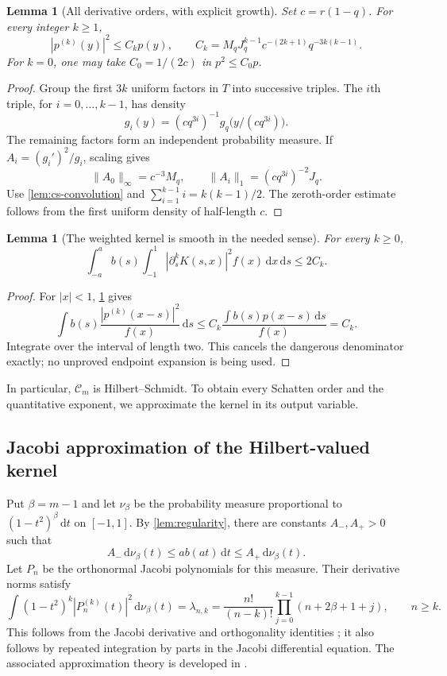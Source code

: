 \documentclass[11pt,a4paper]{article}
\numberwithin{equation}{section}
\newtheorem{lemma}[theorem]{Lemma}
\theoremstyle{definition}\newtheorem{definition}[theorem]{Definition}
\theoremstyle{remark}\newtheorem{remark}[theorem]{Remark}
\newcommand{\dd}{\,\mathrm d}\newcommand{\ii}{\mathrm i}
\newcommand{\calC}{\mathcal C_m}\newcommand{\calP}{\mathcal P}
\newcommand{\norm}[1]{\lVert #1\rVert}
\begin{document}
\begin{lemma}[All derivative orders, with explicit growth]
\label{lem:derivatives}
Set $c=r(1-q)$. For every integer $k\ge1$,
\begin{equation}
 |p^{(k)}(y)|^2\le C_kp(y),\qquad
 C_k=M_qJ_q^{k-1}c^{-(2k+1)}q^{-3k(k-1)}.
 \label{eq:Ck}
\end{equation}
For $k=0$, one may take $C_0=1/(2c)$ in $p^2\le C_0p$.
\end{lemma}
\begin{proof}
Group the first $3k$ uniform factors in $T$ into successive triples. The $i$th triple, for $i=0,\ldots,k-1$, has density
\[
 g_i(y)=(cq^{3i})^{-1}g_q\bigl(y/(cq^{3i})\bigr).
\]
The remaining factors form an independent probability measure. If $A_i=(g_i')^2/g_i$, scaling gives
\[
 \norm{A_0}_\infty=c^{-3}M_q,
 \qquad \norm{A_i}_1=(cq^{3i})^{-2}J_q.
\]
Use \cref{lem:cs-convolution} and $\sum_{i=1}^{k-1}i=k(k-1)/2$. The zeroth-order estimate follows from the first uniform density of half-length $c$.
\end{proof}

\begin{lemma}[The weighted kernel is smooth in the needed sense]
\label{lem:kernel-derivatives}
For every $k\ge0$,
\begin{equation}
 \int_{-a}^{a}\!b(s)\int_{-1}^{1}
 |\partial_s^kK(s,x)|^2 f(x)\dd x\dd s\le2C_k.
 \label{eq:kernel-derivatives}
\end{equation}
\end{lemma}
\begin{proof}
For $|x|<1$, \cref{lem:derivatives} gives
\[
 \int b(s)\frac{|p^{(k)}(x-s)|^2}{f(x)}\dd s
 \le C_k\frac{\int b(s)p(x-s)\dd s}{f(x)}=C_k.
\]
Integrate over the interval of length two. This cancels the dangerous denominator exactly; no unproved endpoint expansion is being used.
\end{proof}
In particular, $\calC$ is Hilbert--Schmidt. To obtain every Schatten order and the quantitative exponent, we approximate the kernel in its output variable.

\subsection{Jacobi approximation of the Hilbert-valued kernel}
Put $\beta=m-1$ and let $\nu_\beta$ be the probability measure proportional to $(1-t^2)^\beta\dd t$ on $[-1,1]$. By \cref{lem:regularity}, there are constants $A_-,A_+>0$ such that
\begin{equation}
 A_-\dd\nu_\beta(t)\le a b(at)\dd t\le A_+\dd\nu_\beta(t).
 \label{eq:jacobi-comparison}
\end{equation}
Let $P_n$ be the orthonormal Jacobi polynomials for this measure. Their derivative norms satisfy
\begin{equation}
 \int (1-t^2)^k|P_n^{(k)}(t)|^2\dd\nu_\beta(t)
 =\lambda_{n,k}
 =\frac{n!}{(n-k)!}\prod_{j=0}^{k-1}(n+2\beta+1+j),\qquad n\ge k.
 \label{eq:jacobi-multiplier}
\end{equation}
This follows from the Jacobi derivative and orthogonality identities \cite{dlmf}; it also follows by repeated integration by parts in the Jacobi differential equation. The associated approximation theory is developed in \cite{xu}.
\end{document}
